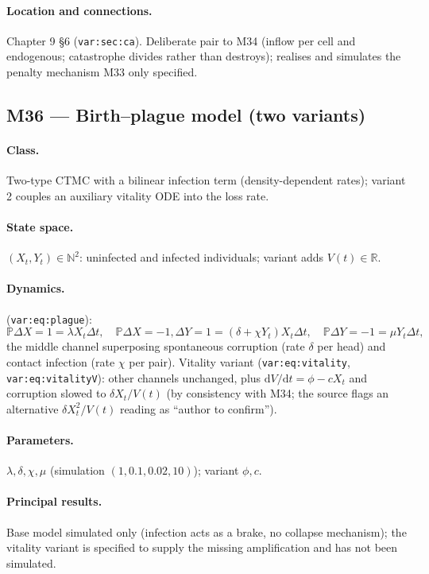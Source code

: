 \documentclass[11pt,a4paper]{article}
\newcommand{\PR}{\mathbb{P}}
\newcommand{\dd}{\mathrm{d}}
\begin{document}
\paragraph{Location and connections.} Chapter 9 \S6
(\texttt{var:sec:ca}). Deliberate pair to M34 (inflow per cell and
endogenous; catastrophe divides rather than destroys); realises and
simulates the penalty mechanism M33 only specified.

\subsection{M36 --- Birth--plague model (two variants)}

\paragraph{Class.} Two-type CTMC with a bilinear infection term
(density-dependent rates); variant 2 couples an auxiliary vitality ODE into
the loss rate.

\paragraph{State space.} $(X_t,Y_t)\in\mathbb N^2$: uninfected and
infected individuals; variant adds $V(t)\in\mathbb R$.

\paragraph{Dynamics.} (\texttt{var:eq:plague}):
\[
\PR{\Delta X=1}=\lambda X_t\Delta t,\quad
\PR{\Delta X=-1,\Delta Y=1}=(\delta+\chi Y_t)X_t\Delta t,\quad
\PR{\Delta Y=-1}=\mu Y_t\Delta t,
\]
the middle channel superposing spontaneous corruption (rate $\delta$ per
head) and contact infection (rate $\chi$ per pair). Vitality variant
(\texttt{var:eq:vitality}, \texttt{var:eq:vitalityV}): other channels
unchanged, plus $\dd V/\dd t=\phi-cX_t$ and corruption slowed to
$\delta X_t/V(t)$ (by consistency with M34; the source flags an
alternative $\delta X_t^2/V(t)$ reading as ``author to confirm'').

\paragraph{Parameters.} $\lambda,\delta,\chi,\mu$ (simulation
$(1,0.1,0.02,10)$); variant $\phi,c$.

\paragraph{Principal results.} Base model simulated only (infection acts
as a brake, no collapse mechanism); the vitality variant is specified to
supply the missing amplification and has not been simulated.
\end{document}
